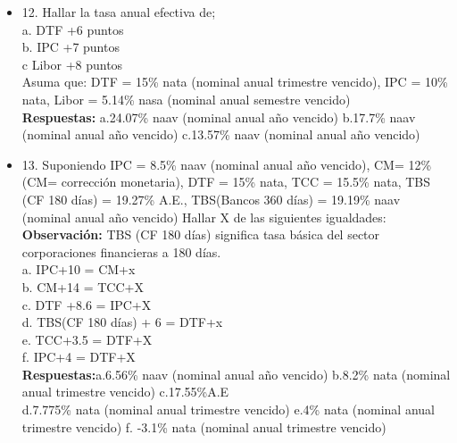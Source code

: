 \begin{itemize}
 \item 12. Hallar la tasa anual efectiva de;\\
       a. DTF +6 puntos\\
       b. IPC +7 puntos\\
       c Libor +8 puntos\\
       Asuma que: DTF = 15\% nata (nominal anual trimestre vencido), IPC = 10\% nata, Libor = 5.14\% nasa (nominal anual semestre vencido)\\
       \textbf{Respuestas:} a.24.07\% naav (nominal anual año vencido)\hspace{0,5cm} b.17.7\% naav (nominal anual año vencido)\hspace{0,5cm} c.13.57\% naav (nominal anual año vencido)\\
       \medskip

 \item 13. Suponiendo IPC = 8.5\% naav (nominal anual año vencido), CM= 12\% (CM= corrección monetaria), DTF = 15\% nata, TCC = 15.5\% nata, TBS (CF 180 días) = 19.27\% A.E., TBS(Bancos 360 días) = 19.19\% naav (nominal anual año vencido) Hallar X de las siguientes igualdades:\\
       \textbf{Observación:} TBS (CF 180 días) significa tasa básica del sector corporaciones financieras a 180 días.\\

       a. IPC+10 = CM+x\\
       b. CM+14 = TCC+X\\
       c. DTF +8.6 = IPC+X\\
       d. TBS(CF 180 días) + 6 = DTF+x\\
       e. TCC+3.5 = DTF+X\\
       f. IPC+4 = DTF+X\\
       \textbf{Respuestas:}a.6.56\% naav (nominal anual año vencido)\hspace{0,5cm} b.8.2\% nata (nominal anual trimestre vencido)\hspace{0,5cm} c.17.55\%A.E
       \\d.7.775\% nata (nominal anual trimestre vencido)\hspace{0,5cm} e.4\% nata (nominal anual trimestre vencido)\hspace{0,5cm} f. -3.1\% nata (nominal anual trimestre vencido)\\
       \medskip


\end{itemize}
